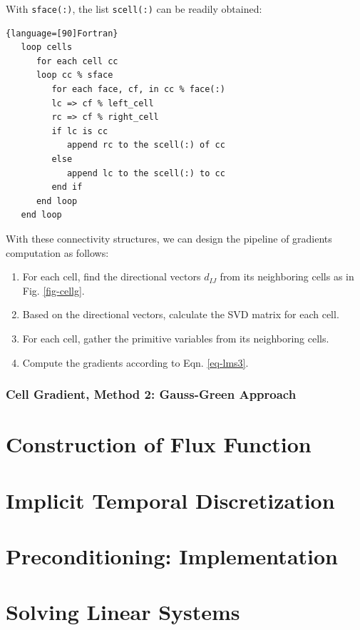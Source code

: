 \documentclass[12pt, letterpaper]{report}
\begin{document}
With \verb+sface(:)+, the list \verb+scell(:)+ can be readily obtained:

\begin{lstlisting}{language=[90]Fortran}
   loop cells
      for each cell cc
      loop cc % sface
         for each face, cf, in cc % face(:)
         lc => cf % left_cell
         rc => cf % right_cell
         if lc is cc
            append rc to the scell(:) of cc
         else
            append lc to the scell(:) to cc
         end if
      end loop
   end loop
\end{lstlisting}

With these connectivity structures, we can design the pipeline of gradients computation as follows:

\begin{enumerate}
   \item For each cell, find the directional vectors $d_{IJ}$ from its neighboring cells as in Fig.
      \ref{fig-cellg}.
   \item Based on the directional vectors, calculate the SVD matrix for each cell.
   \item For each cell, gather the primitive variables from its neighboring cells.
   \item Compute the gradients according to Eqn. \ref{eq-lms3}.
\end{enumerate}

\subsubsection{Cell Gradient, Method 2: Gauss-Green Approach}

\paraspace
\section{Construction of Flux Function}

\section{Implicit Temporal Discretization}

\section{Preconditioning: Implementation}

\section{Solving Linear Systems}
\end{document}
